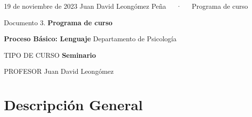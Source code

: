 \documentclass[11pt,a4paper,]{awesome-cv}
\begin{document}
\makecvheader

\makecvfooter
  {19 de noviembre de 2023}
    {Juan David Leongómez Peña~~~·~~~Programa de curso}
  {\thepage}





\vspace{4mm}
\begin{tcolorbox}[enhanced,
        on line, 
        boxsep=4pt, left=0pt,right=0pt,top=0pt,bottom=0pt,
        colframe=white,colback=black]
  
\color{white}
\begin{LARGE}\begin{center}
Documento 3. \textbf{Programa de curso}
\end{center}\end{LARGE}
\end{tcolorbox}

\begin{LARGE}\begin{center}
\textbf{Proceso Básico: Lenguaje}\linebreak
Departamento de Psicología
\end{center}\end{LARGE}

\begin{cvskills}
  \cvskill
    {TIPO DE CURSO}
    {\textbf{Seminario}}
    
  \cvskill
    {PROFESOR}
    {Juan David Leongómez}
\end{cvskills}

\hypertarget{descripciuxf3n-general}{%
\section{Descripción General}\label{descripciuxf3n-general}}
\end{document}
